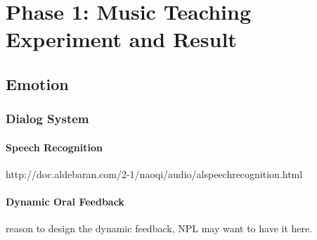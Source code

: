 \chapter{Phase 1: Music Teaching Experiment and Result}

\section{Emotion}
\subsection{Dialog System}

\subsubsection{Speech Recognition}
http://doc.aldebaran.com/2-1/naoqi/audio/alspeechrecognition.html

\subsubsection{Dynamic Oral Feedback}
reason to design the dynamic feedback, NPL may want to have it here. 

\